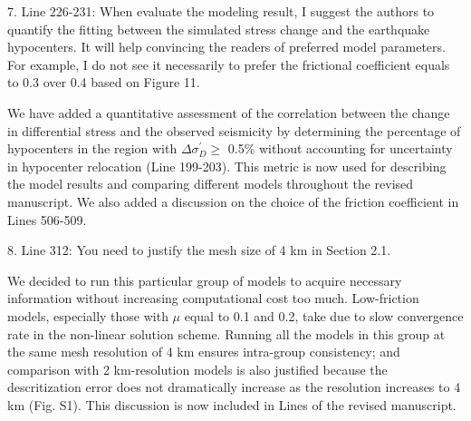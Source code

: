 \documentclass[12pt]{article}
\begin{document}
\begin{response}{7. Line 226-231: When evaluate the modeling result, I suggest the authors to quantify the fitting between the simulated stress change and the earthquake hypocenters. It will help convincing the readers of preferred model parameters. For example, I do not see it necessarily to prefer the frictional coefficient equals to 0.3 over 0.4 based on Figure 11.}

   We have added a quantitative assessment of the correlation between the change in differential stress and the observed seismicity by determining the percentage of hypocenters in the region with $\Delta\sigma_{D}^\prime \ge$ 0.5\% without accounting for uncertainty in hypocenter relocation (Line 199-203). This metric is now used for describing the model results and comparing different models throughout the revised manuscript. We also added a discussion on the choice of the friction coefficient in Lines 506-509.
\end{response}

\begin{response}{8. Line 312: You need to justify the mesh size of 4 km in Section 2.1.}

We decided to run this particular group of models to acquire necessary information without increasing computational cost too much. Low-friction models, especially those with $\mu$ equal to 0.1 and 0.2, take  due to slow convergence rate in the non-linear solution scheme. Running all the models in this group at the same mesh resolution of 4 km ensures intra-group consistency; and comparison with 2 km-resolution models is also justified because the descritization error does not dramatically increase as the resolution increases to 4 km (Fig. S1). This discussion is now included in Lines  of the revised manuscript.
\end{response}
\end{document}
